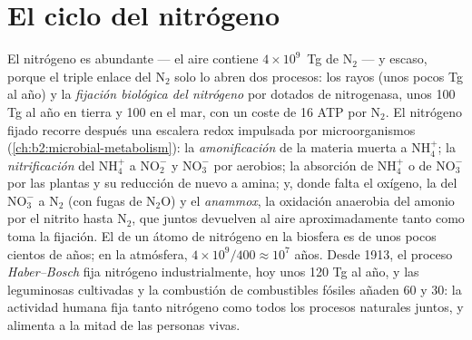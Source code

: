 \section{El ciclo del nitrógeno}

\begin{proposition}\label{prop:b2:biogeochemical-cycles:nitrogen}
El nitrógeno es abundante --- el aire contiene $4\times 10^{9}$~Tg de
$\mathrm{N_2}$ --- y escaso, porque el triple enlace del $\mathrm{N_2}$ solo lo
abren dos procesos: los rayos (unos pocos Tg al año) y la
\emph{fijación biológica del nitrógeno} por  dotados de
nitrogenasa, unos 100 Tg al año en tierra y 100 en el mar, con un coste
de 16 ATP por $\mathrm{N_2}$. El nitrógeno fijado recorre después una
escalera redox impulsada por microorganismos
(\cref{ch:b2:microbial-metabolism}): la \emph{amonificación} de la
materia muerta a $\mathrm{NH_4^{+}}$; la
\emph{nitrificación} del $\mathrm{NH_4^{+}}$ a $\mathrm{NO_2^{-}}$ y $\mathrm{NO_3^{-}}$ por
 aerobios; la absorción de $\mathrm{NH_4^{+}}$ o de $\mathrm{NO_3^{-}}$ por
las plantas y su reducción de nuevo a amina; y, donde falta el oxígeno, la
\emph{} del $\mathrm{NO_3^{-}}$ a $\mathrm{N_2}$ (con fugas de $\mathrm{N_2O}$)
y el \emph{anammox}, la oxidación anaerobia del amonio por el
nitrito hasta $\mathrm{N_2}$, que juntos devuelven al aire aproximadamente
tanto como toma la fijación. El  de un átomo de
nitrógeno en la biosfera es de unos pocos cientos de años; en la
atmósfera, $4\times
10^{9}/400 \approx 10^{7}$ años. Desde 1913, el proceso
\emph{Haber--Bosch} fija nitrógeno industrialmente, hoy unos 120 Tg al
año, y las leguminosas cultivadas y la combustión de combustibles fósiles
añaden 60 y 30: la actividad humana fija tanto nitrógeno como todos los
procesos naturales juntos, y alimenta a la mitad de las personas vivas.
\end{proposition}


